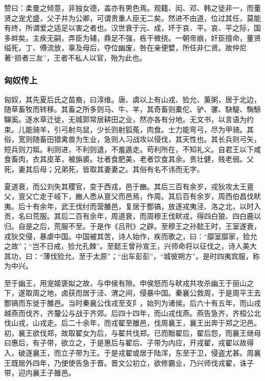 \documentclass[]{article}
\begin{document}
赞曰：柔曼之倾意，非独女德，盖亦有男色焉。观籍、闳、邓、韩之徒非一，而董贤之宠尤盛，父子并为公卿，可谓贵重人臣无二矣。然进不由道，位过其任，莫能有终，所谓爱之适足以害之者也。汉世衰于元、成，坏于哀、平。哀、平之际，国多衅矣。主疾无嗣，弄臣为辅，鼎足不强，栋干微挠。一朝帝崩，奸臣擅命，董贤缢死，丁、傅流放，辜及母后，夺位幽废，咎在亲便嬖，所任非仁贤。故仲尼著``损者三友''，王者不私人以官，殆为此也。

\hypertarget{header-n6171}{%
\subsubsection{匈奴传上}\label{header-n6171}}

匈奴，其先夏后氏之苗裔，曰淳维。唐、虞以上有山戎、猃允、薰粥，居于北边，随草畜牧而转移。其畜之所多则马、牛、羊，其奇畜则橐佗、驴、骡、駃騠、騊駼驒奚。逐水草迁徙，无城郭常居耕田之业，然亦各有分地。无文书，以言语为约束。儿能骑羊，引弓射鸟鼠，少长则射狐菟，肉食。士力能弯弓，尽为甲骑。其俗，宽则随畜田猎禽兽为生业，急则人习战攻以侵伐，其天性也。其长兵则弓矢，短兵则刀铤。利则进，不利则退，不羞遁走。苟利所在，不知礼义。自君王以下咸食畜肉，衣其皮革，被旃裘。壮者食肥美，老者饮食其余。贵壮健，贱老弱。父死，妻其后母；兄弟死，皆取其妻妻之。其俗有名不讳而无字。

夏道衰，而公刘失其稷官，变于西戎，邑于豳。其后三百有余岁，戎狄攻太王亶父，亶父亡走于岐下，豳人悉从亶父而邑焉，作周。其后百有余岁，周西伯昌伐畎夷。后十有余年，武王伐纣而营雒邑，复居于酆镐，放逐戎夷泾、洛之北，以时入贡，名曰荒服。其后二百有余年，周道衰，而周穆王伐畎戎，得四白狼、四白鹿以归。自是之后，荒服不至。于是作《吕刑》之辟。至穆王之孙懿王时，王室遂衰，戎狄交侵，暴虐中国。中国被其苦，诗人始作，疾而歌之，曰：``靡室靡家，猃允之故''；``岂不日戒，猃允孔棘''。至懿王曾孙宣王，兴师命将以征伐之，诗人美大其功，曰：``薄伐猃允，至于太原''；``出车彭彭''，``城彼朔方''。是时四夷宾服，称为中兴。

至于幽王，用宠姬褒姒之故，与申侯有隙。申侯怒而与畎戎共攻杀幽王于丽山之下，遂取周之地，卤获而居于泾、渭之间，侵暴中国。秦襄公救周，于是周平王去酆镐而东徙于雒邑。当时秦襄公伐戎至支阝，始列为诸侯。后六十有五年，而山戎越燕而伐齐，齐釐公与战于齐郊。后四十四年，而山戎伐燕。燕告急齐，齐桓公北伐山戎，山戎走。后二十余年，而戎翟至雒邑，伐周襄王，襄王出奔于郑之汜邑。初，襄王欲伐郑，故取翟女为后，与翟共伐郑。已而黜翟后，翟后怨，而襄王继母曰惠后，有子带，欲立之，于是惠后与翟后、子带为内应，开戎翟，戎翟以故得入，破逐襄王，而立子带为王。于是戎翟或居于陆浑，东至于卫，侵盗尤甚。周襄王既居外四年，乃使使告急于晋。晋文公初立，欲修霸业，乃兴师伐戎翟，诛子带，迎内襄王子雒邑。
\end{document}
